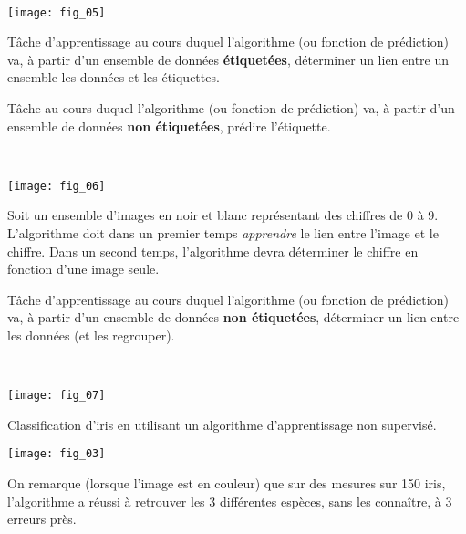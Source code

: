 \begin{exemple}~\\

\begin{center}
\texttt{[image: fig\_05]}
\end{center}
\end{exemple}


\begin{defi}
Tâche d'apprentissage au cours duquel l'algorithme (ou fonction de prédiction) va, à partir d'un ensemble de données \textbf{étiquetées}, déterminer un lien entre un ensemble les données et les étiquettes. 
\end{defi}

\begin{defi}
Tâche au cours duquel l'algorithme (ou fonction de prédiction) va, à partir d'un ensemble de données \textbf{non étiquetées}, prédire l'étiquette.

\end{defi}



\begin{exemple}~\\

\begin{center}
\texttt{[image: fig\_06]}
\end{center}
\end{exemple}


\begin{exemple}
Soit un ensemble d'images en noir et blanc représentant des chiffres de 0 à 9. L'algorithme doit dans un premier temps \textit{apprendre} le lien entre l'image et le chiffre. 
Dans un second temps, l'algorithme devra déterminer le chiffre en fonction d'une image seule.
\end{exemple}

\begin{defi}
Tâche d'apprentissage au cours duquel l'algorithme (ou fonction de prédiction) va, à partir d'un ensemble de données \textbf{non étiquetées}, déterminer un lien entre les données (et les regrouper). 
\end{defi}



\begin{exemple} ~\\


\begin{center}
\texttt{[image: fig\_07]}
\end{center}


Classification d'iris en utilisant un algorithme d'apprentissage non supervisé.
\begin{center}
\texttt{[image: fig\_03]}
\end{center}

On remarque (lorsque l'image est en couleur) que sur des mesures sur 150 iris, l'algorithme a réussi à retrouver les 3 différentes espèces, sans les connaître, à 3 erreurs près.

\end{exemple}


